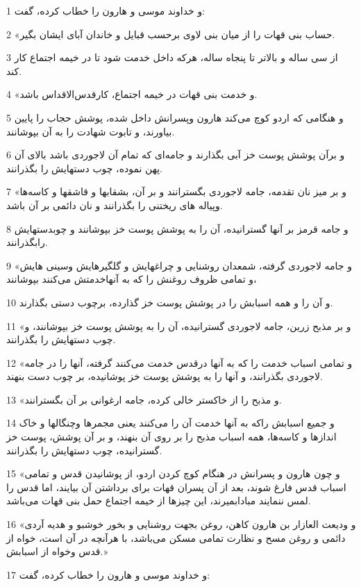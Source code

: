 \par 1 و خداوند موسی و هارون را خطاب کرده، گفت:
\par 2 «حساب بنی قهات را از میان بنی لاوی برحسب قبایل و خاندان آبای ایشان بگیر.
\par 3 از سی ساله و بالاتر تا پنجاه ساله، هر‌که داخل خدمت شود تا در خیمه اجتماع کار کند.
\par 4 «و خدمت بنی قهات در خیمه اجتماع، کارقدس‌الاقداس باشد.
\par 5 و هنگامی که اردو کوچ می‌کند هارون وپسرانش داخل شده، پوشش حجاب را پایین بیاورند، و تابوت شهادت را به آن بپوشانند.
\par 6 و برآن پوشش پوست خز آبی بگذارند و جامه‌ای که تمام آن لاجوردی باشد بالای آن پهن نموده، چوب دستهایش را بگذرانند.
\par 7 «و بر میز نان تقدمه، جامه لاجوردی بگسترانند و بر آن، بشقابها و قاشقها و کاسه‌ها وپیاله های ریختنی را بگذرانند و نان دائمی بر آن باشد.
\par 8 و جامه قرمز بر آنها گسترانیده، آن را به پوشش پوست خز بپوشانند و چوبدستهایش رابگذرانند.
\par 9 «و جامه لاجوردی گرفته، شمعدان روشنایی و چراغهایش و گلگیرهایش وسینی هایش و تمامی ظروف روغنش را که به آنهاخدمتش می‌کنند بپوشانند،
\par 10 و آن را و همه اسبابش را در پوشش پوست خز گذارده، برچوب دستی بگذارند.
\par 11 «و بر مذبح زرین، جامه لاجوردی گسترانیده، آن را به پوشش پوست خز بپوشانند، و چوب دستهایش را بگذرانند.
\par 12 «و تمامی اسباب خدمت را که به آنها درقدس خدمت می‌کنند گرفته، آنها را در جامه لاجوردی بگذرانند، و آنها را به پوشش پوست خز پوشانیده، بر چوب دست بنهند.
\par 13 «و مذبح را از خاکستر خالی کرده، جامه ارغوانی بر آن بگسترانند.
\par 14 و جمیع اسبابش راکه به آنها خدمت آن را می‌کنند یعنی مجمرها وچنگالها و خاک اندازها و کاسه‌ها، همه اسباب مذبح را بر روی آن بنهند، و بر آن پوشش، پوست خز گسترانیده، چوب دستهایش را بگذرانند.
\par 15 «و چون هارون و پسرانش در هنگام کوچ کردن اردو، از پوشانیدن قدس و تمامی اسباب قدس فارغ شوند، بعد از آن پسران قهات برای برداشتن آن بیایند، اما قدس را لمس ننمایند مبادابمیرند، این چیزها از خیمه اجتماع حمل بنی قهات می‌باشد.
\par 16 «و ودیعت العازار بن هارون کاهن، روغن بجهت روشنایی و بخور خوشبو و هدیه آردی دائمی و روغن مسح و نظارت تمامی مسکن می‌باشد، با هرآنچه در آن است، خواه از قدس وخواه از اسبابش.»
\par 17 و خداوند موسی و هارون را خطاب کرده، گفت:
